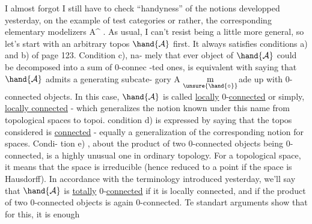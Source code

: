   I almost forgot I still have to check ``handyness'' of the notions
developped yesterday,  on the example of test categories or rather,  the
corresponding elementary modelizers A\^{} .  As usual,  I can't resist being
a little more general,  so let's start with an arbitrary topos $\hand{\mathcal{A}}$ first.
It always satisfies conditions a) and b) of page 123.  Condition c),  na-%
mely that ever object of $\hand{\mathcal{A}}$ could be decomposed into a sum of 0-connec%
-ted ones,  is equivalent with saying that $\hand{\mathcal{A}}$ admits a generating subcate-%
gory  A $\underset{\unsure{\hand{\circ}}}{\mathrm m}$ade up with 0-connected objects.  In this case, $\hand{\mathcal{A}}$ is called
\uline{locally} 0-\uline{connected} or simply,  \uline{locally connected}  -  which generalizes
the notion known under this name from topological spaces to topoi.  
condition d) is expressed by saying that the topos considered is \uline{connected}
- equally a generalization of the corresponding notion for spaces.  Condi-%
tion e) ,  about the product of two 0-connected objects
being 0-connected,  is a highly unusual one in ordinary topology.  For a
topological space,  it means that the space is irreducible (hence reduced
to a point if the space is Hausdorff).  In accordance with the terminology
introduced yesterday,  we'll say that $\hand{\mathcal{A}}$ is \uline{totally} 0-\uline{connected} if it is
locally connected,  and if the product of two 0-connected objects is again
0-connected.  Te standart arguments show that for this,  it is enough

